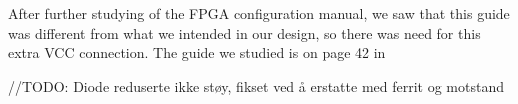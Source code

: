 After further studying of the FPGA configuration manual, we saw that this guide was different from what we intended in our design, so there was need for this extra VCC connection. The guide we studied is on page 42 in \cite{fpga-configuration}

//TODO: Diode reduserte ikke støy, fikset ved å erstatte med ferrit og motstand